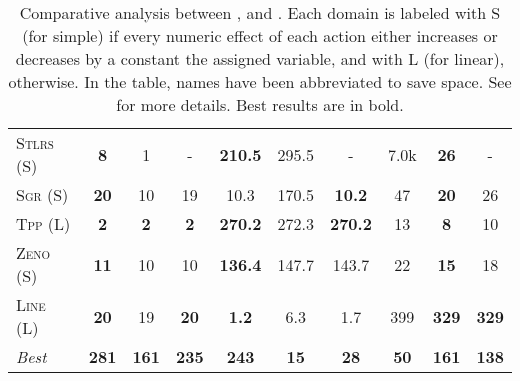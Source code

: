 \documentclass[11pt]{article}
\begin{document}
\begin{table*}[tb]
{\begin{tabular}{|l||ccc||ccc||ccc||}
\textsc{Stlrs} (S)&\textbf{8}&1&-&\textbf{210.5}&295.5&-&7.0k&\textbf{26}&-\\
\textsc{Sgr} (S)&\textbf{20}&10&19&10.3&170.5&\textbf{10.2}&47&\textbf{20}&26\\
\textsc{Tpp} (L)&\textbf{2}&\textbf{2}&\textbf{2}&\textbf{270.2}&272.3&\textbf{270.2}&13&\textbf{8}&10\\
\textsc{Zeno} (S)&\textbf{11}&10&10&\textbf{136.4}&147.7&143.7&22&\textbf{15}&18\\
\textsc{Line} (L)&\textbf{20}&19&\textbf{20}&\textbf{1.2}&6.3&1.7&399&\textbf{329}&\textbf{329}
\\\hline
\textit{Best}&\textbf{281}&\textbf{161}&\textbf{235}&\textbf{243}&\textbf{15}&\textbf{28}&\textbf{50}&\textbf{161}&\textbf{138}\\\hline

        \end{tabular}}
        \caption{Comparative analysis between  \pattye, \pattym and \pattyi. Each domain is labeled with S (for simple) if every numeric effect of each action either increases or decreases by a constant the assigned variable, and with L (for linear), otherwise. In the table, names have been abbreviated to save space.  See \cite{ipc2023} for more details. Best results are in bold.}
        \label{tab:qual-plans}
        \end{table*}
        
\end{document}

